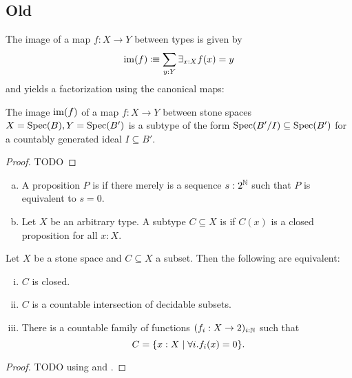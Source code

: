 \subsection{Old}

\begin{definition}
  The image of a map $f:X\to Y$ between types is given by
  \[
  \operatorname{im}(f) \vcentcolon\mspace{-1.2mu}\equiv \sum_{y:Y} \exists_{x:X}f(x)=y
  \]
  and yields a factorization using the canonical maps:
  \begin{center}
  \end{center}
\end{definition}

\begin{proposition}
  \label{stone-image}
  The image $\operatorname{im}(f)$ of a map $f:X\to Y$ between stone spaces $X=\operatorname{Spec}(B),Y=\operatorname{Spec}(B')$ is a subtype of the form $\operatorname{Spec}(B'/I)\subseteq \operatorname{Spec}(B')$ for a countably generated ideal $I\subseteq B'$.  
\end{proposition}

\begin{proof}
  TODO
\end{proof}

\begin{definition}
  \begin{enumerate}[(a)]
  \item A proposition $P$ is  if there merely is a sequence $s:2^{\mathbb{N}}$ such that $P$ is equivalent to $s=0$.
  \item Let $X$ be an arbitrary type.
    A subtype $C\subseteq X$ is  if $C(x)$ is a closed proposition for all $x:X$.
  \end{enumerate}
\end{definition}

\begin{proposition}\label{propClosedAlternativeDefinitions}
  Let $X$ be a stone space and $C\subseteq X$ a subset.
  Then the following are equivalent:
  \begin{enumerate}[(i)]
  \item $C$ is closed.
  \item $C$ is a countable intersection of decidable subsets.
  \item There is a countable family of functions $(f_i:X\to 2)_{i:\mathbb{N}}$ such that
    \[
    C=\{ x:X \mid \forall i. f_i(x)=0 \}
    \rlap{.}
    \]
  \end{enumerate}
\end{proposition}

\begin{proof}
  TODO using  and .
\end{proof}
